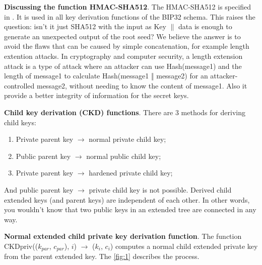 \bigskip

\textbf{Discussing the function HMAC-SHA512}. The HMAC-SHA512 is specified in \cite{Nystrom2005}. It is used in all key derivation functions of the BIP32 schema.
This raises the question: isn't it just SHA512 with the input as Key $\parallel$ data is enough to generate an unexpected output of the root seed? We believe the answer is to avoid the
flaws that can be caused by simple concatenation, for example length extention attacks. In cryptography and computer security, a length extension attack is a type of attack where an attacker can use Hash(message1) and the length of message1 to calculate Hash(message1 ‖ message2) for an attacker-controlled message2, without needing to know the content of message1.
Also it provide a better integrity of information for the secret keys.


\bigskip
{\textbf{Child key derivation (CKD) functions}}. There are 3 methods for deriving child keys:
\begin{enumerate}
    \item Private parent key $\rightarrow$ normal private child key;
    \item Public parent key $\rightarrow$ normal public child key;
    \item Private parent key $\rightarrow$ hardened private child key;
\end{enumerate}
And public parent key $\rightarrow$ private child key is not possible. Derived child extended keys (and parent keys) are independent of each other. In other words, you wouldn’t know that two public keys in an extended tree are connected in any way.

\bigskip
{\textbf{Normal extended child private key derivation function}}.\label{norm1} The function CKDpriv(($k_{par}$, $c_{par}$), $i$) $\rightarrow$ ($k_i$, $c_i$) computes a normal child extended private key from the parent extended key.
The \autoref{fig:1} describes the process.

